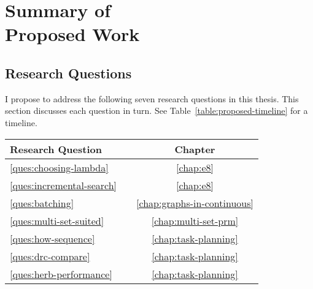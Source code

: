 \chapter[Summary of Proposed Work]{Summary of\\Proposed Work}
\label{chap:proposed}

\section{Research Questions}
\label{sec:research-questions}

I propose to address the following seven research questions
in this thesis.
This section discusses each question in turn.
See Table~\ref{table:proposed-timeline} for a timeline.

\begin{center}
\begin{tabular}{llc}
\toprule
   \multicolumn{2}{l}{Research Question}
      & Chapter \\
\midrule
   \ref{ques:choosing-lambda}
      &
      \begin{minipage}[c]{0.75\columnwidth}%
      \nameref{ques:choosing-lambda}
      \end{minipage}%
      & \ref{chap:e8} \\[12pt]
   \ref{ques:incremental-search}
      &
      \begin{minipage}[c]{0.75\columnwidth}%
      \nameref{ques:incremental-search}
      \end{minipage}%
      & \ref{chap:e8} \\[12pt]
   \ref{ques:batching}
      &
      \begin{minipage}[c]{0.75\columnwidth}%
      \nameref{ques:batching}
      \end{minipage}%
      & \ref{chap:graphs-in-continuous} \\[12pt]
   \ref{ques:multi-set-suited}
      &
      \begin{minipage}[c]{0.75\columnwidth}%
      \nameref{ques:multi-set-suited}
      \end{minipage}%
      & \ref{chap:multi-set-prm} \\[12pt]
   \ref{ques:how-sequence}
      &
      \begin{minipage}[c]{0.75\columnwidth}%
      \nameref{ques:how-sequence}
      \end{minipage}%
      & \ref{chap:task-planning} \\[12pt]
   \ref{ques:drc-compare}
      &
      \begin{minipage}[c]{0.75\columnwidth}%
      \nameref{ques:drc-compare}
      \end{minipage}%
      & \ref{chap:task-planning} \\[12pt]
   \ref{ques:herb-performance}
      &
      \begin{minipage}[c]{0.75\columnwidth}%
      \nameref{ques:herb-performance}
      \end{minipage}%
      & \ref{chap:task-planning} \\[6pt]
\bottomrule
\end{tabular}
\end{center}

